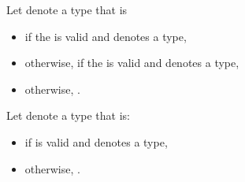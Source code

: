 \pnum
Let  denote a type that is
\begin{itemize}
\item
{} if the  
is valid and denotes a type,
\item
otherwise, 
if the  
is valid and denotes a type,
\item
otherwise, .
\end{itemize}

\pnum
Let  denote a type that is:
\begin{itemize}
\item
{}
if  is valid and denotes a type,
\item
otherwise, .
\end{itemize}

